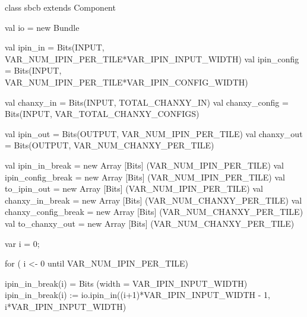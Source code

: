 \begin{scala}
class sbcb extends Component {                                                                        
  val io = new Bundle {                                                                               
    val ipin_in = Bits(INPUT, VAR_NUM_IPIN_PER_TILE*VAR_IPIN_INPUT_WIDTH)                             
    val ipin_config = Bits(INPUT, VAR_NUM_IPIN_PER_TILE*VAR_IPIN_CONFIG_WIDTH)                        
                                                                                                      
    val chanxy_in = Bits(INPUT, TOTAL_CHANXY_IN)                                                      
    val chanxy_config = Bits(INPUT, VAR_TOTAL_CHANXY_CONFIGS)                                         
                                                                                                      
    val ipin_out = Bits(OUTPUT, VAR_NUM_IPIN_PER_TILE)                                                
    val chanxy_out = Bits(OUTPUT, VAR_NUM_CHANXY_PER_TILE)                                            
  }                                                                                                   
                                                                                                      
  val ipin_in_break = new Array [Bits] (VAR_NUM_IPIN_PER_TILE)                                        
  val ipin_config_break = new Array [Bits] (VAR_NUM_IPIN_PER_TILE)                                    
  val to_ipin_out = new Array [Bits] (VAR_NUM_IPIN_PER_TILE)                                          
  val chanxy_in_break = new Array [Bits] (VAR_NUM_CHANXY_PER_TILE)                                    
  val chanxy_config_break = new Array [Bits] (VAR_NUM_CHANXY_PER_TILE)                                
  val to_chanxy_out = new Array [Bits] (VAR_NUM_CHANXY_PER_TILE)                                      
                                                                                                      
  var i = 0;                                                                                          
                                                                                                      
  for ( i <- 0 until VAR_NUM_IPIN_PER_TILE) {                                                         
    ipin_in_break(i) = Bits (width = VAR_IPIN_INPUT_WIDTH)                                            
    ipin_in_break(i) := io.ipin_in((i+1)*VAR_IPIN_INPUT_WIDTH - 1, i*VAR_IPIN_INPUT_WIDTH)            
                                                                                                      
}}
\end{scala}
